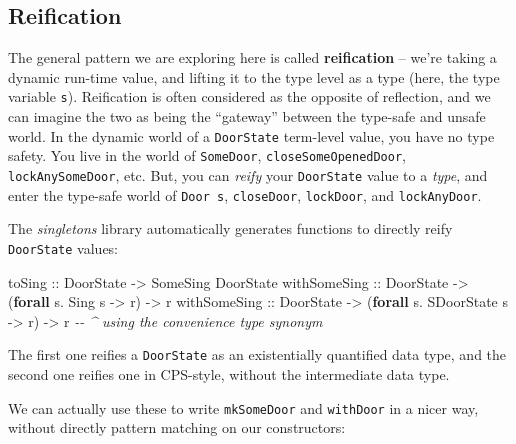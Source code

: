 \documentclass[]{article}
\newenvironment{Shaded}{}{}
\newcommand{\CommentTok}[1]{\textcolor[rgb]{0.38,0.63,0.69}{\textit{#1}}}
\newcommand{\DataTypeTok}[1]{\textcolor[rgb]{0.56,0.13,0.00}{#1}}
\newcommand{\KeywordTok}[1]{\textcolor[rgb]{0.00,0.44,0.13}{\textbf{#1}}}
\newcommand{\NormalTok}[1]{#1}
\newcommand{\OperatorTok}[1]{\textcolor[rgb]{0.40,0.40,0.40}{#1}}
\newcommand{\OtherTok}[1]{\textcolor[rgb]{0.00,0.44,0.13}{#1}}
\begin{document}
\hypertarget{reification}{%
\subsection{Reification}\label{reification}}

The general pattern we are exploring here is called \textbf{reification} --
we're taking a dynamic run-time value, and lifting it to the type level as a
type (here, the type variable \texttt{s}). Reification is often considered as
the opposite of reflection, and we can imagine the two as being the ``gateway''
between the type-safe and unsafe world. In the dynamic world of a
\texttt{DoorState} term-level value, you have no type safety. You live in the
world of \texttt{SomeDoor}, \texttt{closeSomeOpenedDoor},
\texttt{lockAnySomeDoor}, etc. But, you can \emph{reify} your \texttt{DoorState}
value to a \emph{type}, and enter the type-safe world of \texttt{Door\ s},
\texttt{closeDoor}, \texttt{lockDoor}, and \texttt{lockAnyDoor}.

The \emph{singletons} library automatically generates functions to directly
reify \texttt{DoorState} values:

\begin{Shaded}
\begin{Highlighting}[]
\OtherTok{toSing       ::} \DataTypeTok{DoorState} \OtherTok{{-}>} \DataTypeTok{SomeSing} \DataTypeTok{DoorState}
\OtherTok{withSomeSing ::} \DataTypeTok{DoorState} \OtherTok{{-}>}\NormalTok{ (}\KeywordTok{forall}\NormalTok{ s}\OperatorTok{.} \DataTypeTok{Sing}\NormalTok{ s        }\OtherTok{{-}>}\NormalTok{ r) }\OtherTok{{-}>}\NormalTok{ r}
\OtherTok{withSomeSing ::} \DataTypeTok{DoorState} \OtherTok{{-}>}\NormalTok{ (}\KeywordTok{forall}\NormalTok{ s}\OperatorTok{.} \DataTypeTok{SDoorState}\NormalTok{ s  }\OtherTok{{-}>}\NormalTok{ r) }\OtherTok{{-}>}\NormalTok{ r}
                                     \CommentTok{{-}{-} \^{} using the convenience type synonym}
\end{Highlighting}
\end{Shaded}

The first one reifies a \texttt{DoorState} as an existentially quantified data
type, and the second one reifies one in CPS-style, without the intermediate data
type.

We can actually use these to write \texttt{mkSomeDoor} and \texttt{withDoor} in
a nicer way, without directly pattern matching on our constructors:
\end{document}
